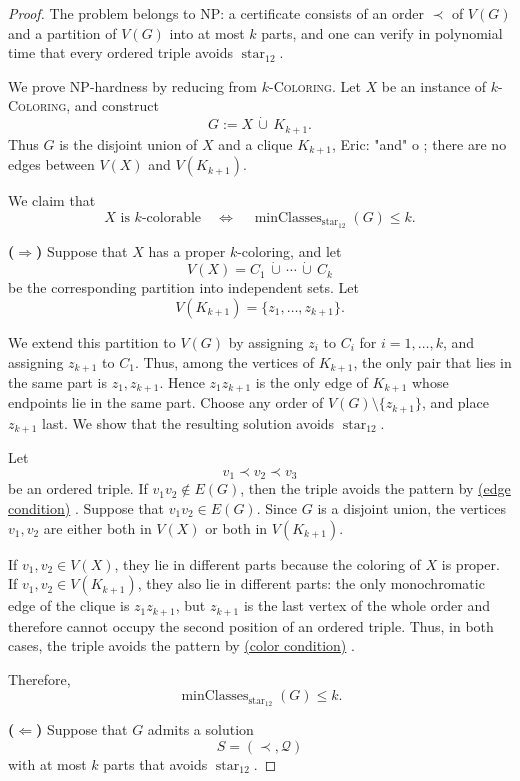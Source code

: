 \documentclass[12pt]{article}
\theoremstyle{plain}
\theoremstyle{definition}
\theoremstyle{remark}
\theoremstyle{definition}
\newcommand{\edgecondition}{%
  \hyperref[def:avoid:cond:edge]{(edge condition)}\xspace
}
\newcommand{\colorcondition}{%
  \hyperref[def:avoid:cond:color]{(color condition)}\xspace
}
\DeclareMathOperator{\minClases}{minClasses}
\newcommand{\eric}[1]{%
  \textcolor{green!50!black}{Eric: #1}%
}
\begin{document}
\begin{proof}
The problem belongs to NP: a certificate consists of an order \(\prec\) of \(V(G)\) and a partition of \(V(G)\)
into at most \(k\) parts, and one can verify in polynomial time that every ordered triple avoids
\(\operatorname{star}_{12}\).

We prove NP-hardness by reducing from \(k\)-\textsc{Coloring}. Let \(X\) be an instance of
\(k\)-\textsc{Coloring}, and construct
\[
G:=X\,\dot\cup\,K_{k+1}.
\]
Thus \(G\) is the disjoint union of \(X\) and a clique \(K_{k+1}\),\eric{"and" o ;} there are no edges between
\(V(X)\) and \(V(K_{k+1})\).

We claim that
\[
X\text{ is \(k\)-colorable}
\quad\Longleftrightarrow\quad
\minClases_{\operatorname{star}_{12}}(G)\le k.
\]

\medskip
\noindent\textbf{(\(\Rightarrow\))}
Suppose that \(X\) has a proper \(k\)-coloring, and let
\[
V(X)=C_1\,\dot\cup\,\cdots\,\dot\cup\,C_k
\]
be the corresponding partition into independent sets. Let
\[
V(K_{k+1})=\{z_1,\dots,z_{k+1}\}.
\]

We extend this partition to \(V(G)\) by assigning \(z_i\) to \(C_i\) for
\(i=1,\dots,k\), and assigning \(z_{k+1}\) to \(C_1\). Thus, among the
vertices of \(K_{k+1}\), the only pair that lies in the same part is
\(z_1,z_{k+1}\). Hence \(z_1z_{k+1}\) is the only edge of \(K_{k+1}\)
whose endpoints lie in the same part.
Choose any order of \(V(G)\setminus\{z_{k+1}\}\), and place \(z_{k+1}\) last. We show that the resulting solution
avoids \(\operatorname{star}_{12}\).

Let
\[
v_1\prec v_2\prec v_3
\]
be an ordered triple. If \(v_1v_2\notin E(G)\), then the triple avoids the pattern by \edgecondition.
Suppose that \(v_1v_2\in E(G)\). Since \(G\) is a disjoint union, the vertices \(v_1,v_2\) are either both in
\(V(X)\) or both in \(V(K_{k+1})\).

If \(v_1,v_2\in V(X)\), they lie in different parts because the coloring of \(X\) is proper. If
\(v_1,v_2\in V(K_{k+1})\), they also lie in different parts: the only monochromatic edge of the clique is
\(z_1z_{k+1}\), but \(z_{k+1}\) is the last vertex of the whole order and therefore cannot occupy the second
position of an ordered triple. Thus, in both cases, the triple avoids the pattern by \colorcondition.

Therefore,
\[
\minClases_{\operatorname{star}_{12}}(G)\le k.
\]

\medskip
\noindent\textbf{(\(\Leftarrow\))}
Suppose that \(G\) admits a solution
\[
S=(\prec,\mathcal Q)
\]
with at most \(k\) parts that avoids \(\operatorname{star}_{12}\).


\end{proof}
\end{document}
